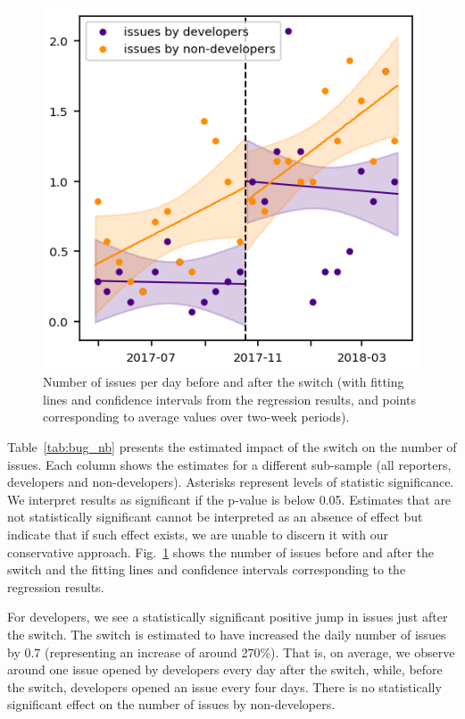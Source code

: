 \documentclass[conference]{IEEEtran}
\begin{document}
\begin{figure}
\includegraphics{bug_nb_rd.png}
\caption{Number of issues per day before and after the switch (with fitting lines and confidence intervals from the regression results, and points corresponding to average values over two-week periods).} \label{bug_nb_rd}
\end{figure}

Table~\ref{tab:bug_nb} presents the estimated impact of the switch on the number of issues. Each column shows the estimates for a different sub-sample (all reporters, developers and non-developers). Asterisks represent levels of statistic significance. We interpret results as significant if the p-value is below 0.05. Estimates that are not statistically significant cannot be interpreted as an absence of effect but indicate that if such effect exists, we are unable to discern it with our conservative approach. Fig.~\ref{bug_nb_rd}  shows the number of issues before and after the switch and the fitting lines and confidence intervals corresponding to the regression results. 

For developers, we see a statistically significant positive jump in issues just after the switch. The switch is estimated to have increased the daily number of issues by 0.7 (representing an increase of around 270\%). That is, on average, we observe around one issue opened by developers every day after the switch,
while, before the switch, developers opened an issue every four days. There is no statistically significant effect on the number of issues by non-developers.
\end{document}
